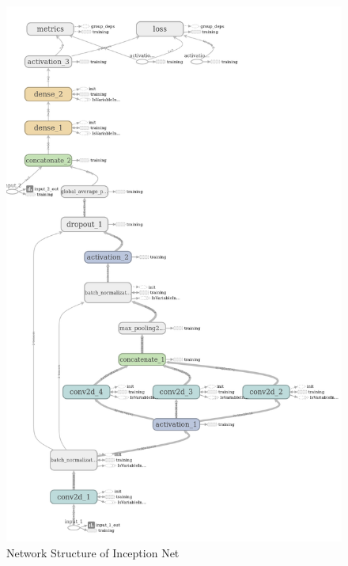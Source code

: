 \documentclass[letterpaper, 10 pt, conference]{../ieeeconf}
\begin{document}
\begin{figure}[t!]
    \centering
        \includegraphics[width=0.7\columnwidth]{figs/inception_net.png}
    \caption{Network Structure of Inception Net} \label{fig:inception_net}
\end{figure}
\end{document}
